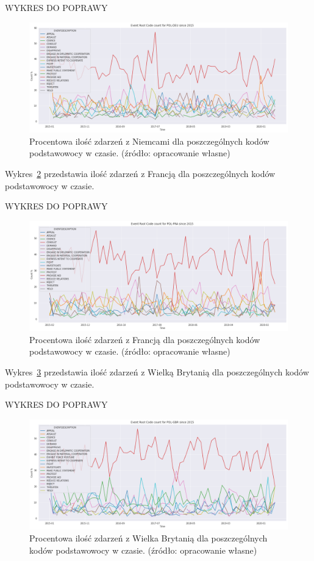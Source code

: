 \documentclass[11pt]{report}
\begin{document}
    WYKRES DO POPRAWY
    \begin{figure}[ht!]
        \centering
        \includegraphics[width=1 \textwidth]{fig/PL/POLDEUERCperc.png}
        \caption{Procentowa ilość zdarzeń z Niemcami dla poszczególnych kodów podstawowocy w czasie. (źródło: opracowanie własne)}
        \label{fig:PLDEUERC}
    \end{figure}

    Wykres~\ref{fig:PLFRAERC} przedstawia ilość zdarzeń z Francją dla poszczególnych kodów podstawowocy w czasie.


    WYKRES DO POPRAWY
    \begin{figure}[ht!]
        \centering
        \includegraphics[width=1 \textwidth]{fig/PL/POLFRAERCperc.png}
        \caption{Procentowa ilość zdarzeń z Francją dla poszczególnych kodów podstawowocy w czasie. (źródło: opracowanie własne)}
        \label{fig:PLFRAERC}
    \end{figure}

    Wykres~\ref{fig:PLGBRERC} przedstawia ilość zdarzeń z Wielką Brytanią dla poszczególnych kodów podstawowocy w czasie.

    WYKRES DO POPRAWY
    \begin{figure}[ht!]
        \centering
        \includegraphics[width=1 \textwidth]{fig/PL/POLGBRERCperc.png}
        \caption{Procentowa ilość zdarzeń z Wielka Brytanią dla poszczególnych kodów podstawowocy w czasie. (źródło: opracowanie własne)}
        \label{fig:PLGBRERC}
    \end{figure}
\end{document}

